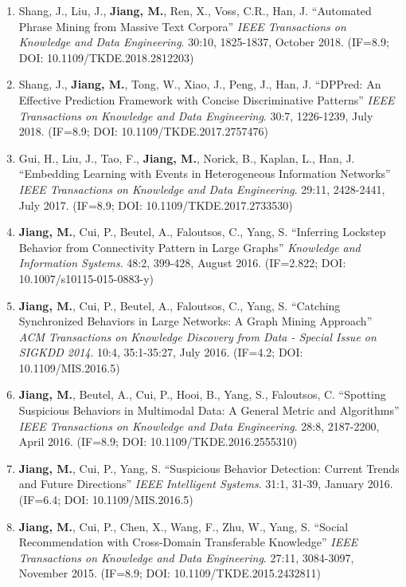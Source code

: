 \documentclass[10pt]{article}
\newenvironment{myindentpar}[1]%
{\begin{list}{}%
         {\setlength{\leftmargin}{#1}}%
         \item[]%
}
{\end{list}}
\newcounter{list}
\begin{document}
\begin{myindentpar}{0.00cm}
\begin{enumerate}[leftmargin=.5cm]
\item[J10] Shang, J., Liu, J., \textbf{Jiang, M.}, Ren, X., Voss, C.R., Han, J. ``Automated Phrase Mining from Massive Text Corpora'' \textit{IEEE Transactions on Knowledge and Data Engineering}. 30:10, 1825-1837, October 2018. (IF=8.9; DOI: 10.1109/TKDE.2018.2812203)

\item[J9] Shang, J., \textbf{Jiang, M.}, Tong, W., Xiao, J., Peng, J., Han, J. ``DPPred: An Effective Prediction Framework with Concise Discriminative Patterns'' \textit{IEEE Transactions on Knowledge and Data Engineering}. 30:7, 1226-1239, July 2018. (IF=8.9; DOI: 10.1109/TKDE.2017.2757476)

\item[J8] Gui, H., Liu, J., Tao, F., \textbf{Jiang, M.}, Norick, B., Kaplan, L., Han, J. ``Embedding Learning with Events in Heterogeneous Information Networks'' \textit{IEEE Transactions on Knowledge and Data Engineering}. 29:11, 2428-2441, July 2017. (IF=8.9; DOI: 10.1109/TKDE.2017.2733530)

\item[J7] \textbf{Jiang, M.}, Cui, P., Beutel, A., Faloutsos, C., Yang, S. ``Inferring Lockstep Behavior from Connectivity Pattern in Large Graphs'' \textit{Knowledge and Information Systems}. 48:2, 399-428, August 2016. (IF=2.822; DOI: 10.1007/s10115-015-0883-y)

\item[J6] \textbf{Jiang, M.}, Cui, P., Beutel, A., Faloutsos, C., Yang, S. ``Catching Synchronized Behaviors in Large Networks: A Graph Mining Approach'' \textit{ACM Transactions on Knowledge Discovery from Data - Special Issue on SIGKDD 2014}. 10:4, 35:1-35:27, July 2016. (IF=4.2; DOI: 10.1109/MIS.2016.5)

\item[J5] \textbf{Jiang, M.}, Beutel, A., Cui, P., Hooi, B., Yang, S., Faloutsos, C. ``Spotting Suspicious Behaviors in Multimodal Data: A General Metric and Algorithms'' \textit{IEEE Transactions on Knowledge and Data Engineering}. 28:8, 2187-2200, April 2016. (IF=8.9; DOI: 10.1109/TKDE.2016.2555310)

\item[J4] \textbf{Jiang, M.}, Cui, P., Yang, S. ``Suspicious Behavior Detection: Current Trends and Future Directions'' \textit{IEEE Intelligent Systems}. 31:1, 31-39, January 2016. (IF=6.4; DOI: 10.1109/MIS.2016.5)

\item[J3] \textbf{Jiang, M.}, Cui, P., Chen, X., Wang, F., Zhu, W., Yang, S. ``Social Recommendation with Cross-Domain Transferable Knowledge'' \textit{IEEE Transactions on Knowledge and Data Engineering}. 27:11, 3084-3097, November 2015. (IF=8.9; DOI: 10.1109/TKDE.2015.2432811)


\end{enumerate}
\end{myindentpar}
\end{document}
